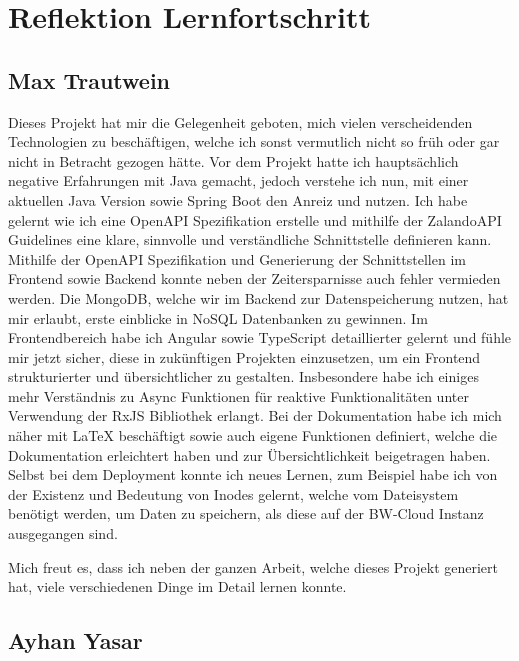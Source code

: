\chapter{Reflektion Lernfortschritt}\label{ch:reflektion-lernfortschritt}


\section{Max Trautwein}
Dieses Projekt hat mir die Gelegenheit geboten, mich vielen verscheidenden Technologien zu beschäftigen,
welche ich sonst vermutlich nicht so früh oder gar nicht in Betracht gezogen hätte.
Vor dem Projekt hatte ich hauptsächlich negative Erfahrungen mit Java gemacht,
jedoch verstehe ich nun, mit einer aktuellen Java Version sowie Spring Boot den Anreiz und nutzen.
Ich habe gelernt wie ich eine OpenAPI Spezifikation erstelle und mithilfe der
ZalandoAPI Guidelines eine klare, sinnvolle und verständliche Schnittstelle definieren kann.
Mithilfe der OpenAPI Spezifikation und Generierung der Schnittstellen im Frontend sowie Backend
konnte neben der Zeitersparnisse auch fehler vermieden werden.
Die MongoDB, welche wir im Backend zur Datenspeicherung nutzen, hat mir erlaubt,
erste einblicke in NoSQL Datenbanken zu gewinnen.
Im Frontendbereich habe ich Angular sowie TypeScript detaillierter gelernt und fühle mir jetzt sicher,
diese in zukünftigen Projekten einzusetzen, um ein Frontend strukturierter und übersichtlicher zu gestalten.
Insbesondere habe ich einiges mehr Verständnis zu Async Funktionen für reaktive Funktionalitäten
unter Verwendung der RxJS Bibliothek erlangt.
Bei der Dokumentation habe ich mich näher mit LaTeX beschäftigt sowie auch eigene Funktionen definiert,
welche die Dokumentation erleichtert haben und zur Übersichtlichkeit beigetragen haben.
Selbst bei dem Deployment konnte ich neues Lernen, zum Beispiel habe ich von der Existenz und Bedeutung von Inodes gelernt,
welche vom Dateisystem benötigt werden, um Daten zu speichern, als diese auf der BW-Cloud Instanz ausgegangen sind.

Mich freut es, dass ich neben der ganzen Arbeit, welche dieses Projekt generiert hat,
viele verschiedenen Dinge im Detail lernen konnte.


\section{Ayhan Yasar}


